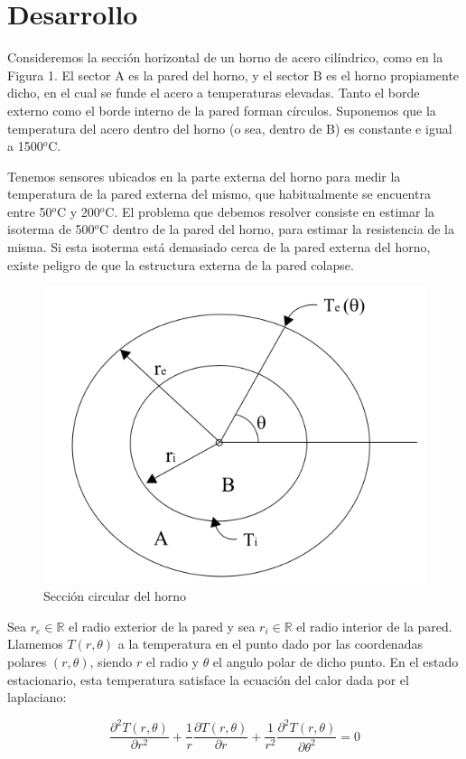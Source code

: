 \section{Desarrollo}

Consideremos la secci\'on horizontal de un horno de acero cil\'indrico, como en la Figura 1. El sector A es la pared del horno, y el sector B es el horno propiamente dicho, en el cual se funde el acero a temperaturas elevadas. Tanto el borde externo como el borde interno de la pared forman c\'irculos. Suponemos que la temperatura del acero dentro del horno (o sea, dentro de B) es constante e igual a 1500$^{o}$C.

\medskip

Tenemos sensores ubicados en la parte externa del horno para medir la temperatura de la pared externa del mismo, que habitualmente se encuentra entre 50$^{o}$C y 200$^{o}$C. El problema que debemos resolver consiste en estimar la isoterma de 500$^{o}$C dentro de la pared del horno, para estimar la resistencia de la misma. Si esta isoterma est\'a demasiado cerca de la pared externa del horno, existe peligro de que la estructura externa de la pared colapse.

\begin{figure}[ht]
\begin{center}
\includegraphics[width=0.4\columnwidth]{catedra/Horno.png}
\caption{Secci\'on circular del horno}
\end{center}
\end{figure}

Sea $r_e \in \mathbb{R}$ el radio exterior de la pared y sea $r_i \in \mathbb{R}$ el radio interior de la pared. Llamemos $T(r,\theta)$ a la temperatura en el punto dado por las coordenadas polares $(r,\theta)$, siendo $r$ el radio y $\theta$ el angulo polar de dicho punto. En el estado estacionario, esta temperatura satisface la ecuación del calor dada por el laplaciano:

\begin{equation}\label{calor}
\frac{\partial^2T(r,\theta)}{\partial r^2}+\frac{1}{r}\frac{\partial T(r,\theta)}{\partial r}+\frac{1}{r^2}\frac{\partial^2T(r,\theta)}{\partial \theta^2} = 0 
\end{equation}

